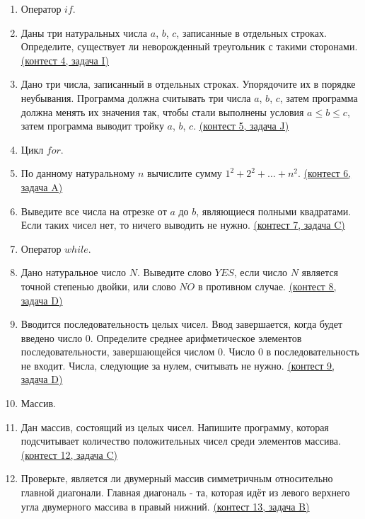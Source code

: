 \documentclass[a4paper,12pt]{article}
\begin{document}
\begin{enumerate}
\item Оператор $if$.
\item Даны три натуральных числа $a$, $b$, $c$, записанные в отдельных строках. Определите, существует ли неворожденный треугольник с такими сторонами. \href{https://informatics.msk.ru/mod/statements/view3.php?chapterid=295}{(контест 4, задача I)}
\item Дано три числа, записанный в отдельных строках. Упорядочите их в порядке неубывания. Программа должна считывать три числа $a$, $b$, $c$, затем программа должна менять их значения так, чтобы стали выполнены условия $a \le b \le c$, затем программа выводит тройку $a$, $b$, $c$. \href{https://informatics.msk.ru/mod/statements/view3.php?chapterid=2961}{(контест 5, задача J)}
\item Цикл $for$.
\item По данному натуральному $n$ вычислите сумму $1^2+2^2+\dots+n^2$. \href{https://informatics.msk.ru/mod/statements/view3.php?chapterid=315}{(контест 6, задача A)}
\item Выведите все числа на отрезке от $a$ до $b$, являющиеся полными квадратами. Если таких чисел нет, то ничего выводить не нужно. \href{https://informatics.msk.ru/mod/statements/view3.php?chapterid=335}{(контест 7, задача C)}
\item Оператор $while$.
\item Дано натуральное число $N$. Выведите слово $YES$, если число $N$ является точной степенью двойки, или слово $NO$ в противном случае. \href{https://informatics.msk.ru/mod/statements/view3.php?chapterid=3060}{(контест 8, задача D)}
\item Вводится последовательность целых чисел. Ввод завершается, когда будет введено число $0$. Определите среднее арифметическое элементов последовательности, завершающейся числом $0$. Число $0$ в последовательность не входит. Числа, следующие за нулем, считывать не нужно. \href{https://informatics.msk.ru/mod/statements/view3.php?chapterid=3066}{(контест 9, задача D)}
\item Массив.
\item Дан массив, состоящий из целых чисел. Напишите программу, которая подсчитывает количество положительных чисел среди элементов массива. \href{https://informatics.msk.ru/mod/statements/view3.php?chapterid=65}{(контест 12, задача C)}
\item Проверьте, является ли двумерный массив симметричным относительно главной диагонали. Главная диагональ - та, которая идёт из левого верхнего угла двумерного массива в правый нижний. \href{https://informatics.msk.ru/mod/statements/view3.php?chapterid=355}{(контест 13, задача B)}

\end{enumerate}
\end{document}
